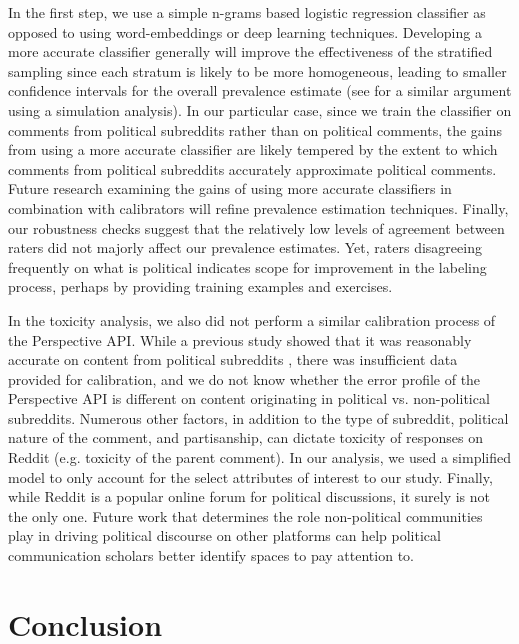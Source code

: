 \documentclass[letterpaper]{article} %
\begin{document}
In the first step, we use a simple n-grams based logistic regression classifier as opposed to using word-embeddings or deep learning techniques. Developing a more accurate classifier generally will improve the effectiveness of the stratified sampling since each stratum is likely to be more homogeneous, leading to smaller confidence intervals for the overall prevalence estimate (see \cite{kumar2018classifier} for a similar argument using a simulation analysis). In our particular case, since we train the classifier on comments from political subreddits rather than on political comments, the gains from using a more accurate classifier are likely tempered by the extent to which comments from political subreddits accurately approximate political comments. Future research examining the gains of using more accurate classifiers in combination with calibrators will refine prevalence estimation techniques. Finally, our robustness checks suggest that the relatively low levels of agreement between raters did not majorly affect our prevalence estimates. Yet, raters disagreeing frequently on what is political indicates scope for improvement in the labeling process, perhaps by providing training examples and exercises.



In the toxicity analysis, we also did not perform a similar calibration process of the Perspective API. While a previous study showed that it was reasonably accurate on content from political subreddits \cite{rajadesingan2020quick}, there was insufficient data provided for calibration, and we do not know whether the error profile of the Perspective API is different on content originating in political vs. non-political subreddits. Numerous other factors, in addition to the type of subreddit, political nature of the comment, and partisanship, can dictate toxicity of responses on Reddit (e.g. toxicity of the parent comment). In our analysis, we used a simplified model to only account for the select attributes of interest to our study. 
Finally, while Reddit is a popular online forum for political discussions, it surely is not the only one. Future work that determines the role non-political communities play in driving political discourse on other platforms can help political communication scholars better identify spaces to pay attention to.


\section{Conclusion}
\end{document}
